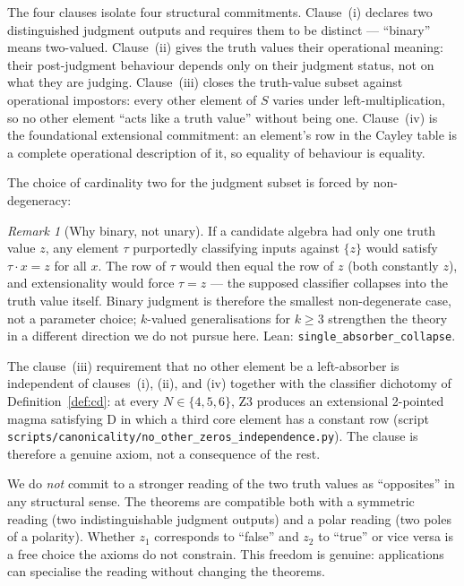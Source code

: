 \documentclass[sigconf,screen]{acmart}
\newcommand{\dotop}{\cdot}
\theoremstyle{remark}
\newtheorem{remark}{Remark}
\begin{document}
The four clauses isolate four structural commitments. Clause~(i) declares
two distinguished judgment outputs and requires them to be distinct ---
``binary'' means two-valued. Clause~(ii) gives the truth values their
operational meaning: their post-judgment behaviour depends only on
their judgment status, not on what they are judging. Clause~(iii) closes
the truth-value subset against operational impostors: every other element
of $S$ varies under left-multiplication, so no other element ``acts like
a truth value'' without being one. Clause~(iv) is the foundational
extensional commitment: an element's row in the Cayley table is a
complete operational description of it, so equality of behaviour is
equality.

The choice of cardinality two for the judgment subset is forced by
non-degeneracy:

\begin{remark}[Why binary, not unary]
\label{rem:single-judgment}
If a candidate algebra had only one truth value $z$, any element
$\tau$ purportedly classifying inputs against $\{z\}$ would satisfy
$\tau \dotop x = z$ for all $x$. The row of $\tau$ would then equal the
row of $z$ (both constantly $z$), and extensionality would force
$\tau = z$ --- the supposed classifier collapses into the truth value
itself. Binary judgment is therefore the smallest non-degenerate case,
not a parameter choice; $k$-valued generalisations for $k \geq 3$
strengthen the theory in a different direction we do not pursue here.
Lean: \texttt{single\_absorber\_collapse}.
\end{remark}

The clause~(iii) requirement that no other element be a left-absorber
is independent of clauses~(i), (ii), and (iv) together with the
classifier dichotomy of Definition~\ref{def:cd}: at every $N \in \{4, 5, 6\}$,
Z3 produces an extensional 2-pointed magma satisfying D in which a third
core element has a constant row (script
\texttt{scripts/canonicality/no\_other\_zeros\_independence.py}). The
clause is therefore a genuine axiom, not a consequence of the rest.

We do \emph{not} commit to a stronger reading of the two truth values as
``opposites'' in any structural sense. The theorems are compatible both
with a symmetric reading (two indistinguishable judgment outputs) and a
polar reading (two poles of a polarity). Whether $z_1$ corresponds to
``false'' and $z_2$ to ``true'' or vice versa is a free choice the
axioms do not constrain. This freedom is genuine: applications can
specialise the reading without changing the theorems.
\end{document}
